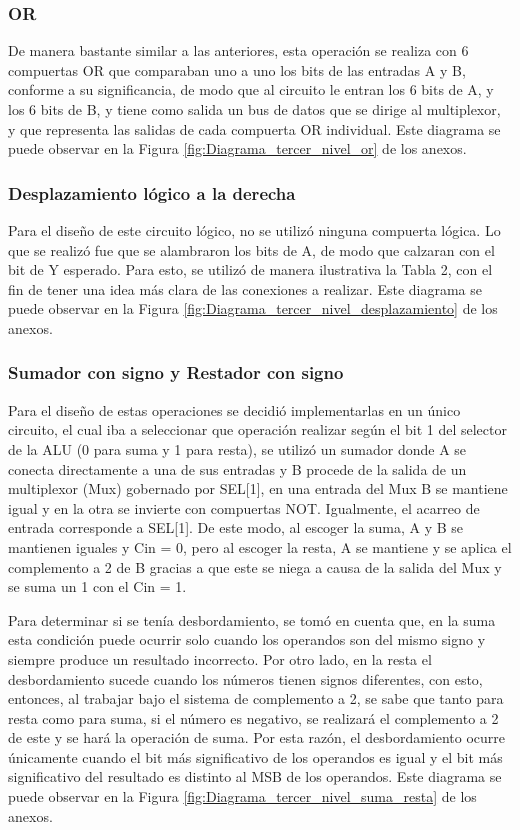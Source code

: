 \documentclass[journal,trans]{IEEEtran}
\begin{document}
\subsubsection{OR}
De manera bastante similar a las anteriores, esta operación se realiza con 6 compuertas OR que comparaban uno a uno los bits de las entradas A y B, conforme a su significancia, de modo que al circuito le entran los 6 bits de A, y los 6 bits de B, y tiene como salida un bus de datos que se dirige al multiplexor, y que representa las salidas de cada compuerta OR individual. Este diagrama se puede observar en la Figura \ref{fig:Diagrama_tercer_nivel_or} de los anexos. 

\subsubsection{Desplazamiento lógico a la derecha}
Para el diseño de este circuito lógico, no se utilizó ninguna compuerta lógica. Lo que se realizó fue que se alambraron los bits de A, de modo que calzaran con el bit de Y esperado. Para esto, se utilizó de manera ilustrativa la Tabla 2, con el fin de tener una idea más clara de las conexiones a realizar. Este diagrama se puede observar en la Figura \ref{fig:Diagrama_tercer_nivel_desplazamiento} de los anexos.


\subsubsection{Sumador con signo y Restador con signo}
Para el diseño de estas operaciones se decidió implementarlas en un único circuito, el cual iba a seleccionar que operación realizar según el bit 1 del selector de la ALU (0 para suma y 1 para resta), se utilizó un sumador donde A se conecta directamente a una de sus entradas y B procede de la salida de un multiplexor (Mux) gobernado por SEL[1], en una entrada del Mux B se mantiene igual y en la otra se invierte con compuertas NOT. Igualmente, el acarreo de entrada corresponde a SEL[1]. De este modo, al escoger la suma, A y B se mantienen iguales y Cin = 0, pero al escoger la resta, A se mantiene y se aplica el complemento a 2 de B gracias a que este se niega a causa de la salida del Mux y se suma un 1 con el Cin = 1.

Para determinar si se tenía desbordamiento, se tomó en cuenta que, en la suma esta condición puede ocurrir solo cuando los operandos son del mismo signo y siempre produce un resultado incorrecto. Por otro lado, en la resta el desbordamiento sucede cuando los números tienen signos diferentes, con esto, entonces, al trabajar bajo el sistema de complemento a 2, se sabe que tanto para resta como para suma, si el número es negativo, se realizará el complemento a 2 de este y se hará la operación de suma. Por esta razón, el desbordamiento ocurre únicamente cuando el bit más significativo de los operandos es igual y el bit más significativo del resultado es distinto al MSB de los operandos. Este diagrama se puede observar en la Figura \ref{fig:Diagrama_tercer_nivel_suma_resta} de los anexos.
\end{document}
